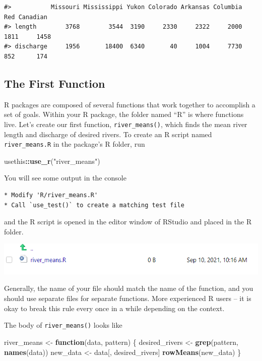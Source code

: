 \documentclass[
]{book}
\newenvironment{Shaded}{\begin{snugshade}}{\end{snugshade}}
\newcommand{\ControlFlowTok}[1]{\textcolor[rgb]{0.13,0.29,0.53}{\textbf{#1}}}
\newcommand{\KeywordTok}[1]{\textcolor[rgb]{0.13,0.29,0.53}{\textbf{#1}}}
\newcommand{\NormalTok}[1]{#1}
\newcommand{\OperatorTok}[1]{\textcolor[rgb]{0.81,0.36,0.00}{\textbf{#1}}}
\newcommand{\StringTok}[1]{\textcolor[rgb]{0.31,0.60,0.02}{#1}}
\begin{document}
\begin{verbatim}
#>           Missouri Mississippi Yukon Colorado Arkansas Columbia  Red Canadian
#> length        3768        3544  3190     2330     2322     2000 1811     1458
#> discharge     1956       18400  6340       40     1004     7730  852      174
\end{verbatim}

\hypertarget{first-function}{%
\subsection{The First Function}\label{first-function}}

R packages are composed of several functions that work together to accomplish a set of goals. Within your R package, the folder named ``R'' is where functions live. Let's create our first function, \texttt{river\_means()}, which finds the mean river length and discharge of desired rivers. To create an R script named \texttt{river\_means.R} in the package's R folder, run

\begin{Shaded}
\begin{Highlighting}[]
\NormalTok{usethis}\OperatorTok{::}\KeywordTok{use_r}\NormalTok{(}\StringTok{"river_means"}\NormalTok{)}
\end{Highlighting}
\end{Shaded}

You will see some output in the console

\begin{verbatim}
* Modify 'R/river_means.R'
* Call `use_test()` to create a matching test file 
\end{verbatim}

and the R script is opened in the editor window of RStudio and placed in the R folder.

\includegraphics[width=1\linewidth]{images/newrpack_function}

Generally, the name of your file should match the name of the function, and you should use separate files for separate functions. More experienced R users -- it is okay to break this rule every once in a while depending on the context.

The body of \texttt{river\_means()} looks like

\begin{Shaded}
\begin{Highlighting}[]
\NormalTok{river_means <-}\StringTok{ }\ControlFlowTok{function}\NormalTok{(data, pattern) \{}
\NormalTok{  desired_rivers <-}\StringTok{ }\KeywordTok{grep}\NormalTok{(pattern, }\KeywordTok{names}\NormalTok{(data))}
\NormalTok{  new_data <-}\StringTok{ }\NormalTok{data[, desired_rivers]}
  \KeywordTok{rowMeans}\NormalTok{(new_data)}
\NormalTok{\}}
\end{Highlighting}
\end{Shaded}
\end{document}
